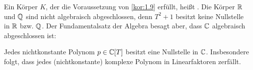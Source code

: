 \begin{bemerkung}
	\label{bem:1.10}
	Ein Körper $K$, der die Voraussetzung von \autoref{kor:1.9} erfüllt, heißt .
	Die Körper $\mathbb{R}$ und $\mathbb{Q}$ sind nicht algebraisch abgeschlossen, denn $T^2+1$ besitzt keine Nullstelle in $\mathbb{R}$ bzw. $\mathbb{Q}$.
	Der Fundamentalsatz der Algebra besagt aber, dass $\mathbb{C}$ algebraisch abgeschlossen ist:
\end{bemerkung}
\newpage
\begin{satz}
	\label{satz:1.11}
	Jedes nichtkonstante Polynom $p \in \mathbb{C}[T]$ besitzt eine Nullstelle in $\mathbb{C}$.
	Insbesondere folgt, dass jedes (nichtkonstante) komplexe Polynom in Linearfaktoren zerfällt. 
\end{satz}

